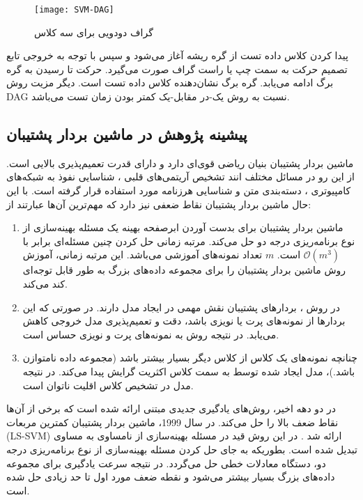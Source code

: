 \begin{figure}[!t]
	\centering
	\texttt{[image: SVM-DAG]}
	\caption[گراف دودویی  برای سه کلاس]{گراف دودویی  برای سه کلاس \cite{shigeo2005}}
	\label{fig:SVM-DAG}
\end{figure}

پیدا کردن کلاس داده تست از گره ریشه آغاز می‌شود و سپس با توجه به خروجی تابع تصمیم حرکت به سمت چپ یا راست گراف صورت می‌گیرد. حرکت  تا رسیدن به گره برگ ادامه می‌یابد. گره برگ نشان‌دهنده کلاس داده تست است. دیگر مزیت روش \gls*{DAG} نسبت به روش یک-در مقابل-یک کمتر بودن زمان تست می‌باشد.


\subsection{پیشینه پژوهش در ماشین بردار پشتیبان}\label{sec:2:1:4}
ماشین بردار پشتیبان بنیان ریاضی قوی‌ای دارد و دارای قدرت تعمیم‌پذیری بالایی است. از این رو در مسائل مختلف انند تشخیص آریتمی‌های قلبی \cite{nasiri2009}، شناسایی نفوذ به شبکه‌های کامپیوتری \cite{raman2017}، دسته‌بندی متن\cite{lee2012} و شناسایی 
هرزنامه \cite{zoubi2018} مورد استفاده قرار گرفته است. با این حال ماشین بردار پشتیبان نقاط ضعفی نیز دارد که مهم‌ترین آن‌ها عبارتند از:
\begin{enumerate}
	\item ماشین بردار پشتیبان برای بدست آوردن ابرصفحه بهینه یک مسئله بهینه‌سازی از نوع برنامه‌ریزی درجه دو حل می‌کند. مرتبه زمانی حل کردن چنین مسئله‌ای برابر با   $\mathcal{O}({{m}^{3}})$ است.  $m$ تعداد نمونه‌های آموزشی می‌باشد. این مرتبه زمانی، آموزش روش ماشین بردار پشتیبان را برای مجموعه داده‌های بزرگ به طور قابل توجه‌ای کند می‌کند.
	\item در روش ، بردارهای پشتیبان نقش مهمی در ایجاد مدل دارند. در صورتی که این بردارها از نمونه‌های پرت یا نویزی باشد، دقت و تعمیم‌پذیری مدل خروجی کاهش می‌یابد. در نتیجه روش  به نمونه‌های پرت و نویزی حساس است.
	\item چنانچه نمونه‌های یک کلاس از کلاس دیگر بسیار بیشتر باشد (مجموعه داده نامتوازن باشد.)، مدل ایجاد شده توسط   به سمت کلاس اکثریت گرایش پیدا می‌کند. در نتیجه مدل در تشخیص کلاس اقلیت ناتوان است.
\end{enumerate}

\indent در دو دهه اخیر، روش‌های یادگیری جدیدی مبتنی  ارائه شده است که برخی از آن‌ها نقاط ضعف بالا را حل می‌کند. در سال 1999، ماشین بردار پشتیبان کمترین مربعات (\gls{LS-SVM}) ارائه شد \cite{suykens1999}. در این روش قید در مسئله بهینه‌سازی از نامساوی به مساوی تبدیل شده است. بطوریکه به جای حل کردن مسئله بهینه‌سازی از نوع برنامه‌ریزی درجه دو، دستگاه معادلات خطی حل می‌گردد. در نتیجه سرعت یادگیری برای مجموعه داده‌های بزرگ بسیار بیشتر می‌شود و نقطه ضعف مورد اول تا حد زیادی حل شده است.

